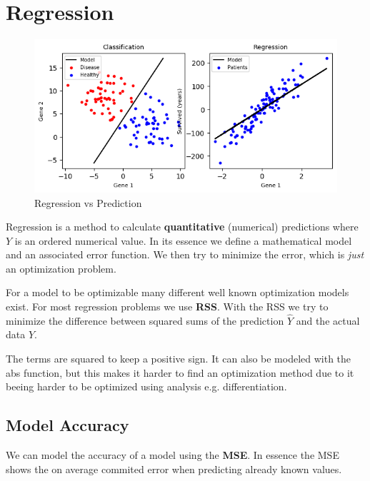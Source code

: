 \documentclass[../Main.tex]{subfiles}
\begin{document}

\newpage
\section{Regression}
\begin{figure}[H]
    \centering
    \includegraphics[width=0.5\linewidth]{Images/regr-vs-class.png}
    \caption{Regression vs Prediction}
\end{figure}
Regression is a method to calculate \textbf{quantitative} (numerical) predictions where \(Y\) is an ordered numerical value.
In its essence we define a mathematical model and an associated error function.
We then try to minimize the error, which is \textit{just} an optimization problem.

For a model to be optimizable many different well known optimization models exist.
For most regression problems we use \textbf{RSS}.
With the RSS we try to minimize the difference between squared sums of the prediction \(\hat{Y}\) and the actual data \(Y\).

The terms are squared to keep a positive sign. It can also be modeled with the abs function, 
but this makes it harder to find an optimization method due to it beeing harder to be optimized using analysis e.g. differentiation.

\subsection{Model Accuracy}
We can model the accuracy of a model using the \textbf{MSE}.
In essence the MSE shows the on average commited error when predicting already known values.

\end{document}
